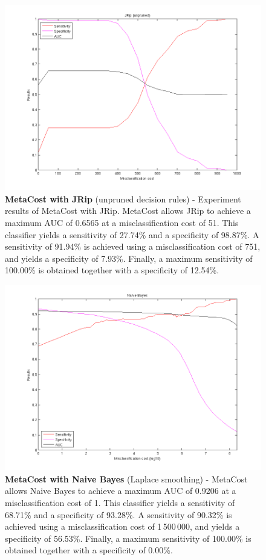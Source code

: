 \newpage
\begin{figure}[h]
\includegraphics[scale=0.65]{img/MC_JRip-unpruned.png}
\caption{\textbf{MetaCost with JRip} (unpruned decision rules) - Experiment results of MetaCost with JRip. MetaCost allows JRip to achieve a maximum AUC of 0.6565 at a misclassification cost of 51. This classifier yields a sensitivity of 27.74\% and a specificity of 98.87\%. A sensitivity of 91.94\% is achieved using a misclassification cost of 751, and yields a specificity of 7.93\%. Finally, a maximum sensitivity of 100.00\% is obtained together with a specificity of 12.54\%.}
\end{figure}

\newpage
\begin{figure}[h]
\includegraphics[scale=0.65]{img/MC_Naivebayes.png}
\caption{\textbf{MetaCost with Naive Bayes} (Laplace smoothing) - MetaCost allows Naive Bayes to achieve a maximum AUC of 0.9206 at a misclassification cost of 1. This classifier yields a sensitivity of 68.71\% and a specificity of 93.28\%. A sensitivity of 90.32\% is achieved using a misclassification cost of 1\,500\,000, and yields a specificity of 56.53\%. Finally, a maximum sensitivity of 100.00\% is obtained together with a specificity of 0.00\%.}
\end{figure}

